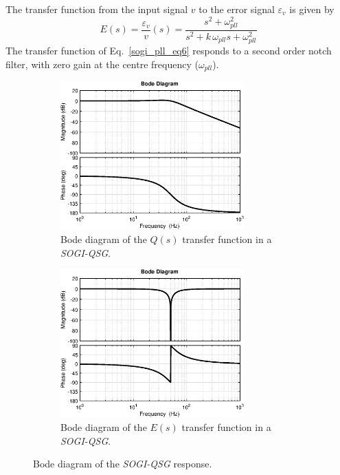 \documentclass[11pt,a4paper,oneside]{book}
\numberwithin{equation}{section}
\theoremstyle{it}
\theoremstyle{definition}
\begin{document}
The transfer function from the input signal $v$ to the error signal $\varepsilon_{v}$ is given by
\begin{equation}\label{sogi_pll_eq6}
	\textit{E}(s)=\frac{\varepsilon_{v}}{v}(s) = \frac{s^2+\omega_{pll}^2}{s^2+k\,\omega_{pll}s+\omega_{pll}^2}
\end{equation}
The transfer function of Eq.~\eqref{sogi_pll_eq6} responds to a second order notch filter, with zero gain at the centre frequency ($\omega_{pll}$).
\begin{figure}[H]
	\centering
	\begin{subfigure}{.5\textwidth}
		\centering
		\includegraphics[width = 200pt, angle = 0,	keepaspectratio]{figures/sogi_Q(s)_bode.eps}
		\captionsetup{width=0.75\textwidth, font=footnotesize}
		\caption{Bode diagram of the $\textit{Q}(s)$ transfer function in a \textit{SOGI-QSG}.}
		\label{bode_response_Q}
	\end{subfigure}%
	\begin{subfigure}{.5\textwidth}
		\centering
		\includegraphics[width = 200pt, angle = 0,	keepaspectratio]{figures/sogi_E(s)_bode.eps}
		\captionsetup{width=0.75\textwidth, font=footnotesize}
		\caption{Bode diagram of the $\textit{E}(s)$ transfer function in a \textit{SOGI-QSG}.}
		\label{bode_response_E}
	\end{subfigure}
	\captionsetup{width=0.5\textwidth, font=small}
	\caption{Bode diagram of the \textit{SOGI-QSG} response.}
	\label{}
\end{figure}
\end{document}

